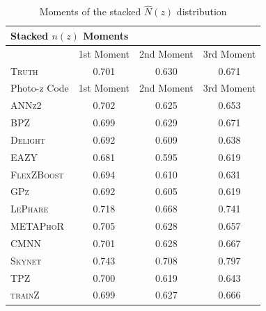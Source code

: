 \documentclass[usenatbib]{mn2e}
\newcommand{\trainz}{\textsc{trainZ}}
\begin{document}
\begin{table}
\setlength{\tabcolsep}{2pt}
\caption{Moments of the stacked $\hat{N}(z)$ distribution}\label{tab:moments}
\begin{tabular}{lccc}
\hline
\hline
 \multicolumn{4}{l}{Stacked $n(z)$ Moments} \\
\hline
              & 1st Moment & 2nd Moment & 3rd Moment \\
\textsc{Truth}     & 0.701      &   0.630    & 0.671  \\
\hline
Photo-z Code       & 1st Moment & 2nd Moment & 3rd Moment\\
\hline
\textsc{ANNz2}     & 0.702      & 0.625      & 0.653    \\ 
\textsc{BPZ}       & 0.699      & 0.629      & 0.671    \\ 
\textsc{Delight}   & 0.692      & 0.609      & 0.638    \\ 
\textsc{EAZY}      & 0.681      & 0.595      & 0.619    \\ 
\textsc{FlexZBoost}& 0.694      & 0.610      & 0.631    \\ 
\textsc{GPz}       & 0.692      & 0.605      & 0.619    \\ 
\textsc{LePhare}   & 0.718      & 0.668      & 0.741    \\ 
\textsc{METAPhoR}  & 0.705      & 0.628      & 0.657    \\ 
\textsc{CMNN}        & 0.701      & 0.628      & 0.667    \\
\textsc{Skynet}    & 0.743      & 0.708      & 0.797    \\
\textsc{TPZ}       & 0.700      & 0.619      & 0.643    \\ 
\hline
\trainz	   & 0.699 		& 0.627 	& 0.666 \\
\end{tabular}
\end{table}
\end{document}
